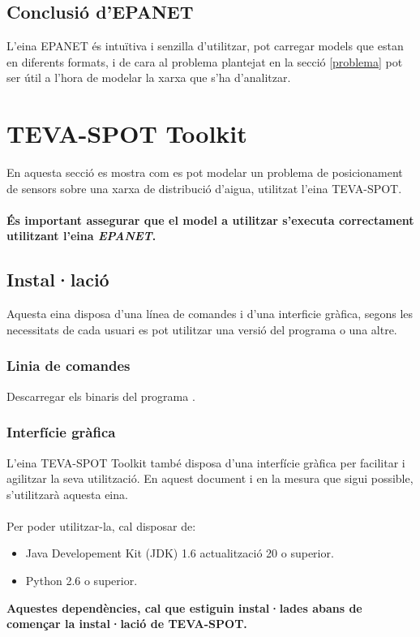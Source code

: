 \documentclass[12pt]{article}
\begin{document}
\subsection{Conclusió d'EPANET}
L'eina EPANET és intuïtiva i senzilla d'utilitzar, pot carregar models que estan en diferents formats, i de cara al problema plantejat en la secció \ref{problema} pot ser útil a l'hora de modelar la xarxa que s'ha d'analitzar.



\clearpage
\section{TEVA-SPOT Toolkit\label{teva-spoot}}
En aquesta secció es mostra com es pot modelar un problema de posicionament de sensors sobre una xarxa de distribució d'aigua, utilitzat l'eina TEVA-SPOT.
\\\\\textbf{És important assegurar que el model a utilitzar s'executa correctament utilitzant l'eina \textit{EPANET}.}
\subsection{Instal·lació}
Aquesta eina disposa d'una línea de comandes i d'una interficie gràfica, segons les necessitats de cada usuari es pot utilitzar una versió del programa o una altre.

\subsubsection{Linia de comandes}
Descarregar els binaris del programa \cite{tevaSpotExec}.

\subsubsection{Interfície gràfica}
L'eina TEVA-SPOT Toolkit també disposa d'una interfície gràfica\cite{tevaSpotGui} per facilitar i agilitzar la seva utilització. En aquest document i en la mesura que sigui possible, s'utilitzarà aquesta eina.
\\\\Per poder utilitzar-la, cal disposar de:
\begin{itemize}
	\item Java Developement Kit (JDK) 1.6 actualització 20 o superior.
	\item Python 2.6 o superior.
\end{itemize}
\textbf{Aquestes dependències, cal que estiguin instal·lades abans de començar la instal·lació de TEVA-SPOT.}
\end{document}
